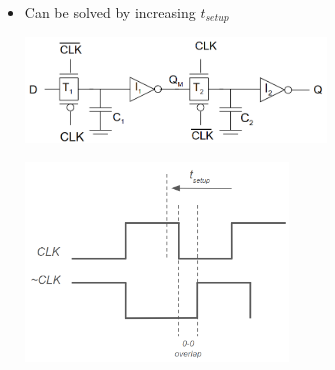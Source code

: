 \documentclass{article}
\begin{document}
\begin{itemize}
\begin{itemize}
            \vspace{0.5cm}
            \item Can be solved by increasing $t_{setup}$

            \begin{minipage}[c]{0.4\textwidth}
                \centering
                \includegraphics[width=8cm, scale=1]{registerRace.PNG}
                \captionsetup{justification=centering}
            \end{minipage}%
            \begin{minipage}[c]{0.6\textwidth}
                \centering
                \includegraphics[width=7cm, scale=1]{setupfix.PNG}
                \captionsetup{justification=centering}
            \end{minipage}%


\end{itemize}
\end{itemize}
\end{document}
